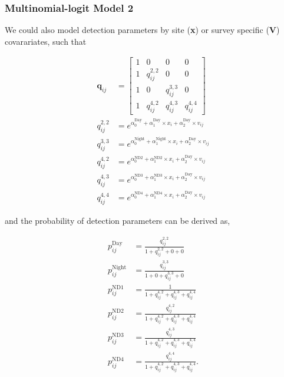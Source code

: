 \documentclass[12pt]{article}
\begin{document}
\subsubsection{Multinomial-logit Model 2}

We could also model detection parameters by site (\textbf{x}) or survey specific (\textbf{V}) covarariates, such that 
\begin{center}
\begin{align*}
\boldsymbol{q}_{ij} &= \begin{bmatrix} 1 & 0 & 0 & 0 \\ 
									1 &  q^{2,2}_{ij} & 0 & 0 \\ 
									1 & 0 & q^{3,3}_{ij} & 0\\
  								       1 & q^{4,2}_{ij} & q^{4,3}_{ij} & q^{4,4}_{ij}
  								      \end{bmatrix}\\
q^{2,2}_{ij} &=e^{\alpha^{\text{Day}}_{0} +\alpha^{\text{Day}}_{1}\times x_{i}+\alpha^{\text{Day}}_{2}\times v_{ij}}\\
q^{3,3}_{ij} &=e^{\alpha^{\text{Night}}_{0} +\alpha^{\text{Night}}_{1}\times x_{i}+\alpha^{\text{Day}}_{2}\times v_{ij}}\\
q^{4,2}_{ij} &=e^{\alpha^{\text{ND2}}_{0} +\alpha^{\text{ND2}}_{1}\times x_{i}+\alpha^{\text{Day}}_{2}\times v_{ij}}\\
q^{4,3}_{ij} &=e^{\alpha^{\text{ND3}}_{0} +\alpha^{\text{ND3}}_{1}\times x_{i}+\alpha^{\text{Day}}_{2}\times v_{ij}}\\
q^{4,4}_{ij} &=e^{\alpha^{\text{ND4}}_{0} +\alpha^{\text{ND4}}_{1}\times x_{i}+\alpha^{\text{Day}}_{2}\times v_{ij}}
\end{align*}
\end{center}
and the probability of detection parameters can be derived as, 
\begin{center}
\begin{align*}
p^{\text{Day}}_{ij} &=\frac{q^{2,2}_{ij}}{1+q^{2,2}_{ij}+0+0}\\
p^{\text{Night}}_{ij} &=\frac{q^{3,3}_{ij}}{1+0+q^{3,3}_{ij}+0}\\
p^{\text{ND1}}_{ij} &=\frac{1}{1+q^{4,2}_{ij}+q^{4,3}_{ij}+q^{4,4}_{ij}}\\
p^{\text{ND2}}_{ij} &=\frac{q^{4,2}_{ij}}{1+q^{4,2}_{ij}+q^{4,3}_{ij}+q^{4,4}_{ij}}\\
p^{\text{ND3}}_{ij} &=\frac{q^{4,3}_{ij}}{1+q^{4,2}_{ij}+q^{4,3}_{ij}+q^{4,4}_{ij}}\\
p^{\text{ND4}}_{ij} &=\frac{q^{4,4}_{ij}}{1+q^{4,2}_{ij}+q^{4,3}_{ij}+q^{4,4}_{ij}}.
\end{align*}
\end{center}
\end{document}
